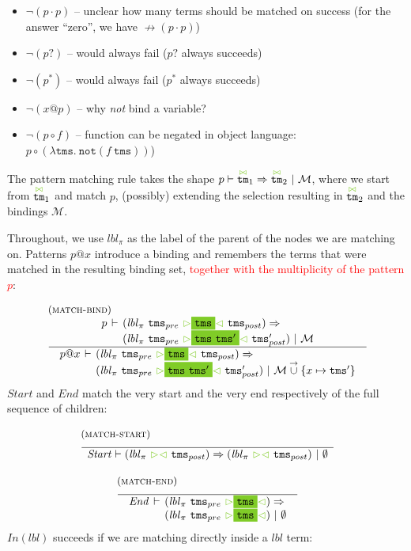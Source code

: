 \documentclass{article}
\makeatletter
\newcommand{\RED}[1]{\textcolor{red}{#1}}
\newcommand{\rulename}{\textsc}
\newcommand{\irule}[3]{\begin{array}{l}{~\small\mbox{(\rulename{#1})}}\\\;\frac{\begin{array}{c}#2\end{array}}{\begin{array}{l}#3\end{array}}\end{array}}
\newcommand{\cursorColor}{LimeGreen}
\newcommand{\lbl}{\ensuremath{\mathit{lbl}}}
\newcommand{\tm}{\ensuremath{\mathtt{tm}}}
\newcommand{\tms}{\ensuremath{\mathtt{tms}}}
\newcommand{\Tmc}{\ensuremath{\overset{ \textcolor{\cursorColor}{\bowtie}}{\tm}}}
\newcommand{\mstart}{\ensuremath{\textcolor{\cursorColor}{\rhd}}}
\newcommand{\mend}{\ensuremath{\textcolor{\cursorColor}{\lhd}}}
\newcommand{\bindings}{\ensuremath{\mathcal{M}}}
\newcommand{\nobindings}{\ensuremath{\emptyset}}
\newcommand{\extend}[2]{\ensuremath{#1\overset{\rightarrow}{\cup}#2}}
\newcommand{\select}[1]{\mstart\colorbox{\cursorColor}{$#1$}\mend}
\newcommand{\matches}[4]{\ensuremath{#1 \vdash #2 \Rightarrow #3 ~|~ #4}}
\newcommand{\xmatches}[4]{\ensuremath{
    \begin{array}{r@{\hspace{4pt}}c@{\hspace{4pt}}l}%
      #1 & \vdash & #2 \Rightarrow\\
         &        & #3 ~|~ #4
    \end{array}}}
\newcommand{\pseq}[2]{\ensuremath{#1 \cdot #2}}
\newcommand{\pnot}[1]{\ensuremath{\lnot #1}}
\newcommand{\maybe}[1]{\ensuremath{#1?}}
\newcommand{\many}[1]{\ensuremath{#1^*}}
\newcommand{\bind}[2]{\ensuremath{#1@#2}}
\newcommand{\paction}[2]{\ensuremath{#1\mathop{\circ} #2}}
\newcommand{\nfb}[1]{\ensuremath{\not\rightarrow(#1)}}
\newcommand{\pin}[1]{\ensuremath{\mathit{In}(#1)}}
\newcommand{\pstart}{\ensuremath{\mathit{Start}}}
\newcommand{\pend}{\ensuremath{\mathit{End}}}
\makeatother
\begin{document}
\begin{itemize}
\item $\pnot{(\pseq{p}{p})}$ -- unclear how many terms should be
  matched on success (for the answer ``zero'', we have
  $\nfb{\pseq{p}{p}}$)
\item $\pnot{(\maybe{p})}$ -- would always fail ($\maybe{p}$ always
  succeeds)
\item $\pnot{(\many{p})}$ -- would always fail ($\many{p}$ always
  succeeds)
\item $\pnot{(\bind{x}{p})}$ -- why \emph{not} bind a variable?
\item $\pnot{(\paction{p}{f})}$ -- function can be negated in
  object language:
  $\paction{p}{(\lambda \tms .~ \texttt{not} (f~\tms))}$)
\end{itemize}
%
%
%
The pattern matching rule takes the shape
$\matches{p}{\Tmc_1}{\Tmc_2}{\bindings}$, where we start from
$\Tmc_1$ and match $p$, (possibly) extending the selection
resulting in $\Tmc_2$ and the bindings $\bindings$.

Throughout, we use $\lbl_\pi$ as the label of the parent of the
nodes we are matching on.
%
Patterns $\bind{p}{x}$ introduce a binding and remembers the terms
that were matched in the resulting binding set, \RED{together with the
multiplicity of the pattern $p$}:

\[
  \begin{array}{c}
    \irule{match-bind}{
    \xmatches{p}{(\lbl_\pi~\tms_{pre}~\select{\tms}~\tms_{post})}
                {(\lbl_\pi~\tms_{pre}~\select{\tms~\tms'}~\tms'_{post})}{\bindings}
    }{
    \xmatches{\bind{p}{x}}
    {(\lbl_\pi~\tms_{pre}~\select{\tms}~\tms_{post})}
    {(\lbl_\pi~\tms_{pre}~\select{\tms~\tms'}~\tms'_{post})}{\extend{\bindings} \{x\mapsto \tms'\}}
    }
  \end{array}
\]
%
\pstart{} and \pend{} match the very start and the very end
respectively of the full sequence of children:

\[
  \begin{array}{c}
    \irule{match-start}{}{
    \matches{\pstart}
    {(\lbl_\pi~\mstart\mend~\tms_{post})}
    {(\lbl_\pi~\mstart\mend~\tms_{post})}{\nobindings}
    }
    \\\\
    \irule{match-end}{}{
    \xmatches{\pend}
    {(\lbl_\pi~\tms_{pre}~\select{\tms})}
    {(\lbl_\pi~\tms_{pre}~\select{\tms})}{\nobindings}
    }
  \end{array}
\]
%
$\pin{\lbl}$ succeeds if we are matching directly inside a $\lbl$
term:
\end{document}
